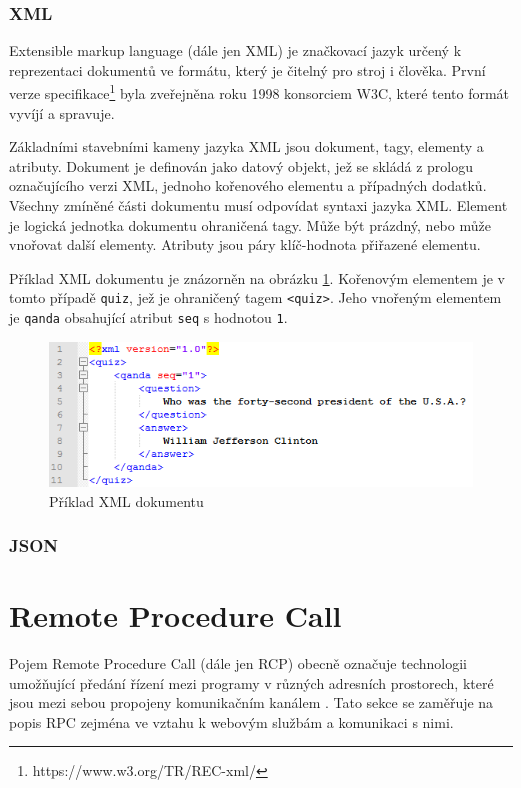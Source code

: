 \documentclass[czech,DP]{thesiskiv}
\begin{document}
\subsubsection{XML}

Extensible markup language (dále jen XML) je značkovací jazyk určený k reprezentaci dokumentů ve formátu, který je čitelný pro stroj i člověka. První verze specifikace\footnote{https://www.w3.org/TR/REC-xml/} byla zveřejněna roku 1998 konsorciem W3C, které tento formát vyvíjí a spravuje.

Základními stavebními kameny jazyka XML jsou dokument, tagy, elementy a atributy. Dokument je definován jako datový objekt, jež se skládá z prologu označujícího verzi XML, jednoho kořenového elementu a případných dodatků. Všechny zmíněné části dokumentu musí odpovídat syntaxi jazyka XML. Element je logická jednotka dokumentu ohraničená tagy. Může být prázdný, nebo může vnořovat další elementy. Atributy jsou páry klíč-hodnota přiřazené elementu.

Příklad XML dokumentu je znázorněn na obrázku \ref{fig:xml-example}. Kořenovým elementem je v tomto případě \verb|quiz|, jež je ohraničený tagem \verb|<quiz>|. Jeho vnořeným elementem je \verb|qanda| obsahující atribut \verb|seq| s hodnotou \verb|1|.

\begin{figure}[h]
	\centering
	\includegraphics[width=12.5cm]{xml-example.png}
	\caption{Příklad XML dokumentu}
	\label{fig:xml-example}
\end{figure} 

\subsubsection{JSON} 

\section{Remote Procedure Call}
\label{sec:rpc-ws}

Pojem Remote Procedure Call (dále jen RCP) obecně označuje technologii umožňující předání řízení mezi programy v různých adresních prostorech, které jsou mezi sebou propojeny komunikačním kanálem \cite{rpcThesis}. Tato sekce se zaměřuje na popis RPC zejména ve vztahu k webovým službám a komunikaci s nimi.
\end{document}
